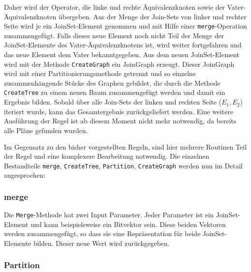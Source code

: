 Daher wird der Operator, die linke und rechte Äquivalenzknoten sowie der Vater-Äquivalenzknoten übergeben. Aus der Menge der Join-Sets von linker und rechter Seite wird je ein JoinSet-Element genommen und mit Hilfe einer \texttt{merge}-Operation zusammengefügt. Falls dieses neue Element noch nicht Teil der Menge der JoinSet-Elemente des Vater-Äquivalenzknotens ist, wird weiter fortgefahren und das neue Element dem Vater bekanntgegeben. Aus dem neuen JoinSet-Element wird mit der Methode \texttt{CreateGraph} ein JoinGraph erzeugt. Dieser JoinGraph wird mit einer Partitionierungsmethode getrennt und so einzelne zusammenhängende Stücke des Graphen gebildet, die durch die Methode \texttt{CreateTree} zu einem neuen Baum zusammengefügt werden und damit ein Ergebnis bilden. Sobald über alle Join-Sets der linken und rechten Seite ($E_1, E_2$) iteriert wurde, kann das Gesamtergebnis zurückgeliefert werden. Eine weitere Ausführung der Regel ist ab diesem Moment nicht mehr notwendig, da bereits alle Pläne gefunden wurden.


Im Gegensatz zu den bisher vorgestellten Regeln, sind hier mehrere Routinen Teil der Regel und eine komplexere Bearbeitung notwendig. Die einzelnen Bestandteile \texttt{merge}, \texttt{CreateTree}, \texttt{Partition}, \texttt{CreateGraph} werden nun im Detail angesprochen:


\subsubsection{merge}

Die \texttt{Merge}-Methode hat zwei Input Parameter. Jeder Parameter ist ein JoinSet-Element und kann beispielsweise ein Bitvektor sein. Diese beiden Vektoren werden zusammengefügt, so dass sie eine Repräsentation für beide JoinSet-Elemente bilden. Dieser neue Wert wird zurückgegeben.


\subsubsection{Partition}






